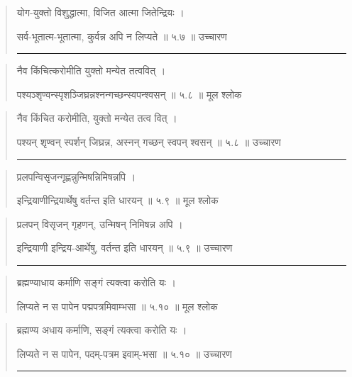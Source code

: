 \begin{quotation}

योग-युक्तो विशुद्धात्मा, विजित आत्मा जितेन्द्रियः  ।  

सर्व-भूतात्म-भूतात्मा, कुर्वन्न अपि न लिप्यते  ॥ ५.७ ॥  उच्चारण

\noindent\rule{16cm}{0.4pt} 
\end{quotation}


\begin{quotation}  

नैव किंचित्करोमीति युक्तो मन्येत तत्ववित्‌  ।  

पश्यञ्शृण्वन्स्पृशञ्जिघ्रन्नश्नन्गच्छन्स्वपन्श्वसन्‌  ॥ ५.८ ॥  मूल श्लोक
\end{quotation}

\begin{quotation}

नैव किंचित करोमीति, युक्तो मन्येत तत्व वित्‌  ।  

पश्यन् शृण्वन् स्पर्शन् जिघ्रन्न, अस्नन् गच्छन् स्वपन् श्वसन्‌  ॥ ५.८ ॥  उच्चारण

\noindent\rule{16cm}{0.4pt} 
\end{quotation}


\begin{quotation}  

प्रलपन्विसृजन्गृह्णन्नुन्मिषन्निमिषन्नपि  । 

इन्द्रियाणीन्द्रियार्थेषु वर्तन्त इति धारयन्‌  ॥ ५.९ ॥  मूल श्लोक
\end{quotation}

\begin{quotation}

प्रलपन् विसृजन् गृहणन्, उन्मिषन् निमिषन्न अपि  । 

इन्द्रियाणी इन्द्रिय-आर्थेषु, वर्तन्त इति धारयन्‌  ॥ ५.९ ॥  उच्चारण

\noindent\rule{16cm}{0.4pt} 
\end{quotation}


\begin{quotation}  

ब्रह्मण्याधाय कर्माणि सङ्‍गं त्यक्त्वा करोति यः  ।  

लिप्यते न स पापेन पद्मपत्रमिवाम्भसा  ॥ ५.१० ॥  मूल श्लोक
\end{quotation}

\begin{quotation}

ब्रह्मण्य अधाय कर्माणि, सङ्‍गं त्यक्त्वा करोति यः  ।  

लिप्यते न स पापेन, पदम्-पत्रम इवाम्-भसा  ॥ ५.१० ॥  उच्चारण

\noindent\rule{16cm}{0.4pt} 
\end{quotation}



